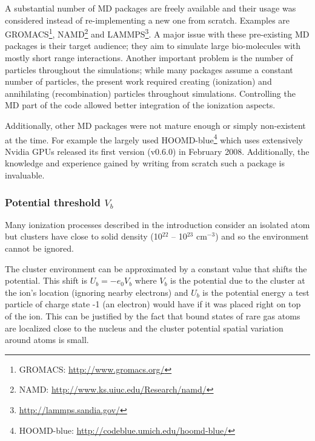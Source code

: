 A substantial number of MD packages are freely available and
their usage was considered instead of re-implementing a new one from scratch.
Examples are GROMACS\footnote{GROMACS:
\url{http://www.gromacs.org/}}, NAMD\footnote{NAMD:
\url{http://www.ks.uiuc.edu/Research/namd/}} and
LAMMPS\footnote{\url{http://lammps.sandia.gov/}}. A major issue with these
pre-existing MD packages is their target audience; they aim to simulate large
bio-molecules with mostly short range interactions. Another important problem
is the number of particles throughout the simulations; while many packages
assume a constant number of particles, the present work required creating
(ionization) and annihilating (recombination) particles throughout simulations.
Controlling the MD part of the code allowed better integration of the
ionization aspects.

Additionally, other MD packages were not mature enough or simply non-existent at the time.
For example the largely used HOOMD-blue\footnote{HOOMD-blue:
\url{http://codeblue.umich.edu/hoomd-blue/}} which uses extensively
Nvidia GPUs released its first version (v0.6.0) in February 2008.
Additionally, the knowledge and experience gained by writing from scratch such
a package is invaluable.





\subsubsection{Potential threshold $V_b$}
\label{section:intro:Vb}

Many ionization processes described in the introduction %
consider an isolated atom but
clusters have close to solid density (10$^{22}$ -- 10$^{23}$ cm$^{-3}$) and
so the environment cannot be ignored.

The cluster environment can be approximated by a constant value that shifts the
potential\cite{Fennel2007}. This shift is $U_b = -e_0 V_b$ where $V_b$ is the
potential due to the cluster at the ion's location (ignoring nearby electrons)
and $U_b$ is the potential energy a test particle of charge state -1 (an electron)
would have if it was placed right on top of the ion. This can be justified by
the fact that bound states of rare gas atoms are localized close to the nucleus
and the cluster potential spatial variation around atoms is small.

